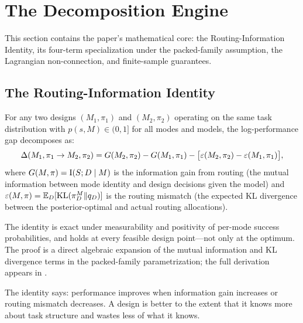 \section{The Decomposition Engine}
\label{sec:decomposition}

This section contains the paper's mathematical core: the Routing-Information Identity, its four-term specialization under the packed-family assumption, the Lagrangian non-connection, and finite-sample guarantees.

\subsection{The Routing-Information Identity}
\label{sec:ri-identity}

\begin{theorem}
\label{thm:ri-identity}
For any two designs $(M_1, \pi_1)$ and $(M_2, \pi_2)$ operating on the same task distribution with $p(s,M) \in (0,1]$ for all modes and models, the log-performance gap decomposes as:
\begin{equation}
\label{eq:ri-identity}
  \Delta(M_1, \pi_1 \to M_2, \pi_2) = G(M_2, \pi_2) - G(M_1, \pi_1)
  - \bigl[\varepsilon(M_2, \pi_2) - \varepsilon(M_1, \pi_1)\bigr],
\end{equation}
where $G(M, \pi) = \mathrm{I}(S; D \mid M)$ is the information gain from routing (the mutual information between mode identity and design decisions given the model) and $\varepsilon(M, \pi) = \mathbb{E}_D[\mathrm{KL}(\pi_D^M \| q_D)]$ is the routing mismatch (the expected KL divergence between the posterior-optimal and actual routing allocations).

The identity is exact under measurability and positivity of per-mode success probabilities, and holds at every feasible design point---not only at the optimum.
The proof is a direct algebraic expansion of the mutual information and KL divergence terms in the packed-family parametrization; the full derivation appears in \citet{beneventano2026framework}.
\end{theorem}

The identity says: performance improves when information gain increases or routing mismatch decreases.  A design is better to the extent that it knows more about task structure and wastes less of what it knows.

